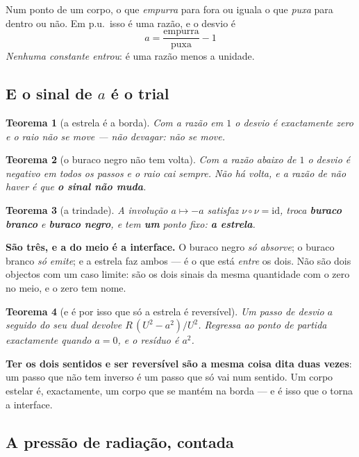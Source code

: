 \documentclass[11pt,a4paper]{article}
\newtheorem{teorema}{Teorema}
\begin{document}
Num ponto de um corpo, o que \emph{empurra} para fora ou iguala o que \emph{puxa} para dentro ou
não. Em p.u.\ isso é uma razão, e o desvio é
\[
  \boxed{\;a=\frac{\text{empurra}}{\text{puxa}}-1\;}
\]
\emph{Nenhuma constante entrou}: é uma razão menos a unidade.

\subsection*{E o sinal de $a$ é o trial}

\begin{teorema}[a estrela é a borda]
Com a razão em $1$ o desvio é exactamente zero e o raio não se move --- não devagar: \emph{não se
move}.
\end{teorema}

\begin{teorema}[o buraco negro não tem volta]
Com a razão abaixo de $1$ o desvio é negativo em \emph{todos} os passos e o raio cai sempre. Não há
volta, e a razão de não haver é que \textbf{o sinal não muda}.
\end{teorema}

\begin{teorema}[a trindade]
A involução $a\mapsto-a$ satisfaz $\nu\circ\nu=\mathrm{id}$, troca \textbf{buraco branco} e
\textbf{buraco negro}, e tem \textbf{um} ponto fixo: \textbf{a estrela}.
\end{teorema}

\noindent \textbf{São três, e a do meio é a interface.} O buraco negro \emph{só absorve}; o buraco
branco \emph{só emite}; e a estrela faz ambos --- é o que está \emph{entre} os dois. Não são dois
objectos com um caso limite: são os dois sinais da mesma quantidade com o zero no meio, e o zero tem
nome.

\begin{teorema}[e é por isso que só a estrela é reversível]
Um passo de desvio $a$ seguido do seu dual devolve $R\,(U^2-a^2)/U^2$. Regressa ao ponto de partida
\emph{exactamente} quando $a=0$, e o resíduo é $a^2$.
\end{teorema}

\noindent \textbf{Ter os dois sentidos e ser reversível são a mesma coisa dita duas vezes}: um passo
que não tem inverso é um passo que só vai num sentido. Um corpo estelar é, exactamente, um corpo que
se mantém na borda --- e é isso que o torna a interface.

\subsection*{A pressão de radiação, contada}
\end{document}
